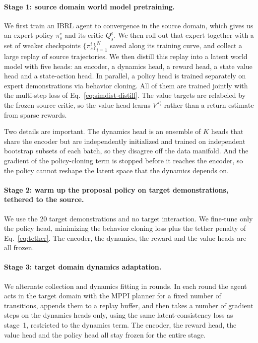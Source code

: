 \documentclass{article} %
\begin{document}
\paragraph{Stage 1: source domain world model pretraining.}
We first train an IBRL agent to convergence in the source domain, which gives us an expert policy $\pi_s^e$ and its critic $Q_s^e$. We then roll out that expert together with a set of weaker checkpoints $\{\pi_s^i\}^N_{i=1}$ saved along its training curve, and collect a large replay of source trajectories. We then distill this replay into a latent world model with five heads: an encoder, a dynamics head, a reward head, a state value head and a state-action head. In parallel, a policy head is trained separately on expert demonstrations via behavior cloning. All of them are trained jointly with the multi-step loss of Eq.~\ref{eq:simdist-distill}. The value targets are relabeled by the frozen source critic, so the value head learns $V^{\pi_s^e}$ rather than a return estimate from sparse rewards.

Two details are important. The dynamics head is an ensemble of $K$ heads that share the encoder but are independently initialized and trained on independent bootstrap subsets of each batch, so they disagree off the data manifold. And the gradient of the policy-cloning term is stopped before it reaches the encoder, so the policy cannot reshape the latent space that the dynamics depends on.

\paragraph{Stage 2: warm up the proposal policy on target demonstrations, tethered to the source.}
We use the $20$ target demonstrations and no target interaction. We fine-tune only the policy head, minimizing the behavior cloning loss plus the tether penalty of Eq.~\ref{eq:tether}. The encoder, the dynamics, the reward and the value heads are all frozen.

\paragraph{Stage 3: target domain dynamics adaptation.}
We alternate collection and dynamics fitting in rounds. In each round the agent acts in the target domain with the MPPI planner for a fixed number of transitions, appends them to a replay buffer, and then takes a number of gradient steps on the dynamics heads only, using the same latent-consistency loss as stage~1, restricted to the dynamics term. The encoder, the reward head, the value head and the policy head all stay frozen for the entire stage.
\end{document}
